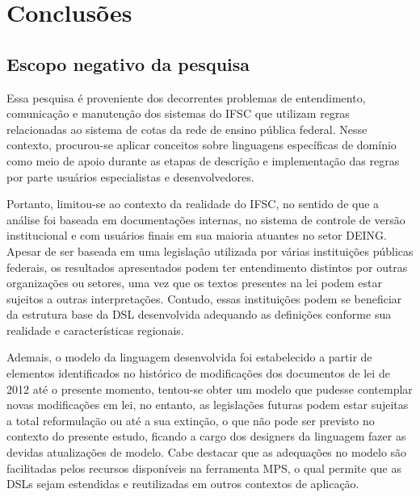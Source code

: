 \chapter{Conclusões}
\label{chap:consideracoes}



\section{Escopo negativo da pesquisa}
\label{escoponegativo}

Essa pesquisa é proveniente dos decorrentes problemas de entendimento, comunicação e manutenção dos sistemas do \gls{IFSC} que utilizam regras relacionadas ao sistema de cotas da rede de ensino pública federal. Nesse contexto, procurou-se aplicar conceitos sobre linguagens específicas de domínio como meio de apoio durante as etapas de descrição e implementação das regras por parte usuários especialistas e desenvolvedores. 

Portanto, limitou-se ao contexto da realidade do \gls{IFSC}, no sentido de que a análise foi baseada em documentações internas, no sistema de controle de versão institucional e com usuários finais em sua maioria atuantes no setor \gls{DEING}. Apesar de ser baseada em uma legislação utilizada por várias instituições públicas federais, os resultados apresentados podem ter entendimento distintos por outras organizações ou setores, uma vez que os textos presentes na lei podem estar sujeitos a outras interpretações. Contudo, essas instituições podem se beneficiar da estrutura base da DSL desenvolvida adequando as definições conforme sua realidade e características regionais.

Ademais, o modelo da linguagem desenvolvida foi estabelecido a partir de elementos identificados no histórico de modificações dos documentos de lei de 2012 até o presente momento, tentou-se obter um modelo que pudesse contemplar novas modificações em lei, no entanto, as legislações futuras podem estar sujeitas a total reformulação ou até a sua extinção, o que não pode ser previsto no contexto do presente estudo, ficando a cargo dos designers da linguagem fazer as devidas atualizações de modelo. Cabe destacar que as adequações no modelo são facilitadas pelos recursos disponíveis na ferramenta MPS, o qual permite que as DSLs sejam estendidas e reutilizadas em outros contextos de aplicação.

